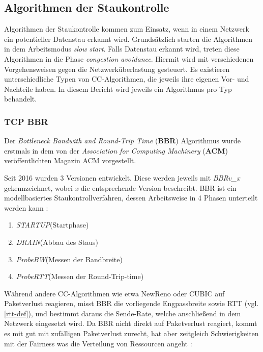 \documentclass[paper=a4,fontsize=12pt,ngerman]{scrartcl}
\begin{document}
\subsection{Algorithmen der Staukontrolle }

Algorithmen der Staukontrolle kommen zum Einsatz, wenn in einem Netzwerk ein potentieller Datenstau erkannt wird.
Grundsätzlich starten die Algorithmen in dem Arbeitsmodus \textit{slow start}.
Falls Datenstau erkannt wird, treten diese Algorithmen in die Phase \textit{congestion avoidance}.
Hiermit wird mit verschiedenen Vorgehensweisen gegen die Netzwerküberlastung gesteuert. 
Es existieren unterschiedliche Typen von CC-Algorithmen, die jeweils ihre eigenen Vor- und Nachteile haben.
In diesem Bericht wird jeweils ein Algorithmus pro Typ behandelt.





\subsubsection{TCP BBR} 
Der \textit{Bottleneck Bandwith and Round-Trip Time} (\textbf{BBR}) Algorithmus wurde erstmals in dem von der
\textit{Association for Computing Machinery} (\textbf{ACM}) veröffentlichten Magazin ACM vorgestellt. \cite{cardwell-iccrg-bbr-congestion-control-02}

Seit 2016 wurden 3 Versionen entwickelt. Diese werden jeweils mit \textit{BBRv\_x} gekennzeichnet, 
wobei \textit{x} die entsprechende Version beschreibt. 
BBR ist ein modellbasiertes Staukontrollverfahren, dessen Arbeitsweise in 4 Phasen
unterteilt werden kann : \newline

\begin{enumerate}
    \item \textit{STARTUP}(Startphase)
    \item \textit{DRAIN}(Abbau des Staus)
    \item \textit{ProbeBW}(Messen der Bandbreite)
    \item \textit{ProbeRTT}(Messen der Round-Trip-time)
\end{enumerate}


Während andere CC-Algorithmen wie etwa NewReno oder CUBIC auf Paketverlust reagieren, misst BBR die vorliegende Engpassbreite sowie RTT (vgl. \ref{rtt-def}),
und bestimmt daraus die Sende-Rate, welche anschließend in dem Netzwerk eingesetzt wird. 
Da BBR nicht direkt auf Paketverlust reagiert, kommt es mit gut mit zufälligen Paketverlust zurecht, hat aber zeitgleich
Schwierigkeiten mit der Fairness was die Verteilung von Ressourcen angeht : 
\end{document}
